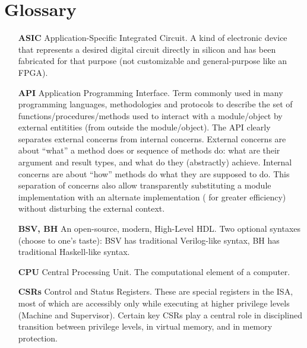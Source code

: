

\chapter{Glossary}


\setcounter{page}{1}
\renewcommand{\thepage}{\Alph{chapter}-\arabic{page}}

\label{apx_Glossary}


\begin{itemize}

\item[\bf ASIC] Application-Specific Integrated Circuit. A kind of
  electronic device that represents a desired digital circuit directly
  in silicon and has been fabricated for that purpose (not
  customizable and general-purpose like an FPGA).

\item[\bf API] Application Programming Interface.  Term commonly used
  in many programming languages, methodologies and protocols to
  describe the set of functions/procedures/methods used to interact
  with a module/object by external entitities (from outside the
  module/object).  The API clearly separates external concerns from
  internal concerns.  External concerns are about ``what'' a method
  does or sequence of methods do: what are their argument and result
  types, and what do they (abstractly) achieve.  Internal concerns are
  about ``how'' methods do what they are supposed to do.  This
  separation of concerns also allow transparently substituting a
  module implementation with an alternate implementation ({\eg} for
  greater efficiency) without disturbing the external context.

\item[\bf BSV, BH] An open-source, modern, High-Level HDL.  Two
  optional syntaxes (choose to one's taste): BSV has traditional
  Verilog-like syntax, BH has traditional Haskell-like syntax.

\item[\bf CPU] Central Processing Unit.  The computational element of
  a computer.

\item[\bf CSRs] Control and Status Registers.  These are special
  registers in the ISA, most of which are accessibly only while
  executing at higher privilege levels (Machine and Supervisor).
  Certain key CSRs play a central role in disciplined transition
  between privilege levels, in virtual memory, and in memory
  protection.


\end{itemize}

